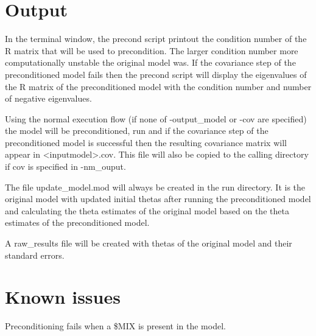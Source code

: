 \section{Output}
In the terminal window, the precond script printout the condition number of the R matrix that will be used to precondition.  The larger condition number more computationally unstable the original model was.  If the covariance step of the preconditioned model fails then the precond script will display the eigenvalues of the R matrix of the preconditioned model with the condition number and number of negative eigenvalues.  

Using the normal execution flow (if none of -output\_model or -cov are specified) the model will be preconditioned, run and if the covariance step of the preconditioned model is successful then the resulting covariance matrix will appear in <inputmodel>.cov. This file will also be copied to the calling
directory if cov is specified in -nm\_ouput.

The file update\_model.mod will always be created in the run directory. It is the original model with updated initial thetas after
running the preconditioned model and calculating the theta estimates of the original model based on the theta estimates of the preconditioned model.

A raw\_results file will be created with thetas of the original model and their standard errors.
%
%
%
%

\section{Known issues}
Preconditioning fails when a \$MIX is present in the model.


